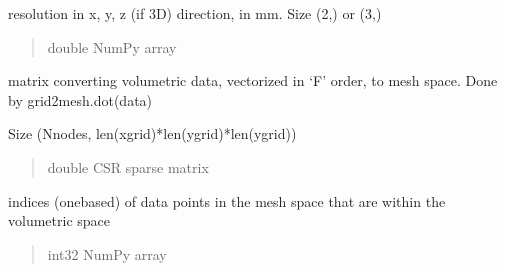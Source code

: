\documentclass[letterpaper,10pt,english]{sphinxmanual}
\begin{document}
\begin{fulllineitems}
\begin{fulllineitems}
\begin{quote}
\begin{description}
\end{description}\end{quote}

\end{fulllineitems}


\begin{fulllineitems}
\label{\detokenize{_autosummary/nirfasterff.base.data.meshvol:nirfasterff.base.data.meshvol.res}}
\pysigstartsignatures
\pysigline
{}
\pysigstopsignatures
\sphinxAtStartPar
resolution in x, y, z (if 3D) direction, in mm. Size (2,) or (3,)
\begin{quote}\begin{description}
\sphinxAtStartPar
double NumPy array

\end{description}\end{quote}

\end{fulllineitems}


\begin{fulllineitems}
\label{\detokenize{_autosummary/nirfasterff.base.data.meshvol:nirfasterff.base.data.meshvol.grid2mesh}}
\pysigstartsignatures
\pysigline
{}
\pysigstopsignatures
\sphinxAtStartPar
matrix converting volumetric data, vectorized in ‘F’ order, to mesh space. Done by grid2mesh.dot(data)

\sphinxAtStartPar
Size (Nnodes, len(xgrid)*len(ygrid)*len(ygrid))
\begin{quote}\begin{description}
\sphinxAtStartPar
double CSR sparse matrix

\end{description}\end{quote}

\end{fulllineitems}


\begin{fulllineitems}
\label{\detokenize{_autosummary/nirfasterff.base.data.meshvol:nirfasterff.base.data.meshvol.meshingrid}}
\pysigstartsignatures
\pysigline
{}
\pysigstopsignatures
\sphinxAtStartPar
indices (one\sphinxhyphen{}based) of data points in the mesh space that are within the volumetric space
\begin{quote}\begin{description}
\sphinxAtStartPar
int32 NumPy array


\end{description}
\end{quote}
\end{fulllineitems}
\end{fulllineitems}
\end{document}
